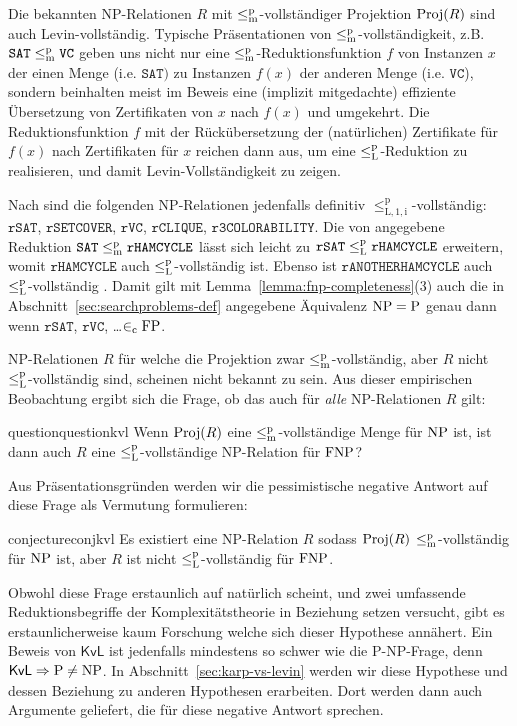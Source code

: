 Die bekannten NP-Relationen $R$ mit $\leq_\mathrm{m}^\mathrm{p}$-vollständiger Projektion $\operatorname{Proj}(R)$ sind auch Levin-vollständig. Typische Präsentationen von $\leq_\mathrm{m}^\mathrm{p}$-vollständigkeit, z.B. $\mathtt{SAT}\leq_\mathrm{m}^\mathrm{p} \mathtt{VC}$ geben uns nicht nur eine $\leq_\mathrm{m}^\mathrm{p}$-Reduktionsfunktion $f$ von Instanzen $x$ der einen Menge (i.e. $\mathtt{SAT})$ zu Instanzen $f(x)$ der anderen Menge (i.e. $\mathtt{VC}$), sondern beinhalten meist im Beweis eine (implizit mitgedachte) effiziente Übersetzung von Zertifikaten von $x$ nach $f(x)$ und umgekehrt. Die Reduktionsfunktion $f$ mit der Rückübersetzung der (natürlichen) Zertifikate für $f(x)$ nach Zertifikaten für $x$ reichen dann aus, um eine $\leq_\mathrm{L}^\mathrm{p}$-Reduktion zu realisieren, und damit Levin-Vollständigkeit zu zeigen.

Nach \textcite[104]{goldreich_computational_2008} sind die folgenden NP-Relationen jedenfalls definitiv $\leq_\mathrm{L,1,i}^\mathrm p$-vollständig: $\mathtt{rSAT}$, $\mathtt{rSETCOVER}$, $\mathtt{rVC}$, $\mathtt{rCLIQUE}$, $\mathtt{r3COLORABILITY}$.
Die von \textcite[193-198]{papadimitriou_computational_1994} angegebene Reduktion $\mathtt{SAT}\leq_\mathrm{m}^\mathrm{p}\mathtt{rHAMCYCLE}$ lässt sich leicht zu $\mathtt{rSAT}\leq_\mathrm{L}^\mathrm{p}\mathtt{rHAMCYCLE}$ erweitern, womit $\mathtt{rHAMCYCLE}$ auch $\leq_\mathrm{L}^\mathrm{p}$-vollständig ist.
Ebenso ist $\mathtt{rANOTHERHAMCYCLE}$ auch $\leq_\mathrm{L}^\mathrm{p}$-vollständig \parencite*[232]{papadimitriou_computational_1994}. Damit gilt mit Lemma~\ref{lemma:fnp-completeness}(3) auch die in Abschnitt~\ref{sec:searchproblems-def} angegebene Äquivalenz $\mathrm{NP}=\mathrm{P}$ genau dann wenn $\mathtt{rSAT}$, $\mathtt{rVC}$, \dots $\in_\mathrm{c} \mathrm{FP}$.

NP-Relationen $R$ für welche die Projektion zwar $\leq_\mathrm{m}^\mathrm{p}$-vollständig, aber $R$ nicht $\leq_\mathrm{L}^\mathrm{p}$-vollständig sind, scheinen nicht bekannt zu sein.
Aus dieser empirischen Beobachtung ergibt sich die Frage, ob das auch für \emph{alle} NP-Relationen $R$ gilt: 
\begin{restatable}{question}{questionkvl}\label{question:kvl}
Wenn $\operatorname{Proj}(R)$ eine $\leq_\mathrm{m}^\mathrm{p}$-vollständige Menge für $\mathrm{NP}$ ist, ist dann auch $R$ eine $\leq_\mathrm{L}^\mathrm{p}$-vollständige NP-Relation für $\mathrm{FNP}$?
\end{restatable}
Aus Präsentationsgründen werden wir die pessimistische negative Antwort auf diese Frage als Vermutung formulieren:
\begin{restatable}{conjecture}{conjkvl}\label{conj:kvl}
    Es existiert eine NP-Relation $R$ sodass $\operatorname{Proj}(R)$ $\leq_\mathrm{m}^\mathrm{p}$-vollständig für $\mathrm{NP}$ ist, aber $R$ ist nicht $\leq_\mathrm{L}^\mathrm{p}$-vollständig für $\mathrm{FNP}$.
\end{restatable}
Obwohl diese Frage erstaunlich auf natürlich scheint, und zwei umfassende Reduktionsbegriffe der Komplexitätstheorie in Beziehung setzen versucht, gibt es erstaunlicherweise kaum Forschung welche sich dieser Hypothese annähert.
Ein Beweis von $\mathsf{KvL}$ ist jedenfalls mindestens so schwer wie die P-NP-Frage, denn $\mathsf{KvL}\Rightarrow \mathrm{P}\neq \mathrm{NP}$.
In Abschnitt~\ref{sec:karp-vs-levin} werden wir diese Hypothese und dessen Beziehung zu anderen Hypothesen erarbeiten. Dort werden dann auch Argumente geliefert, die für diese negative Antwort sprechen.

